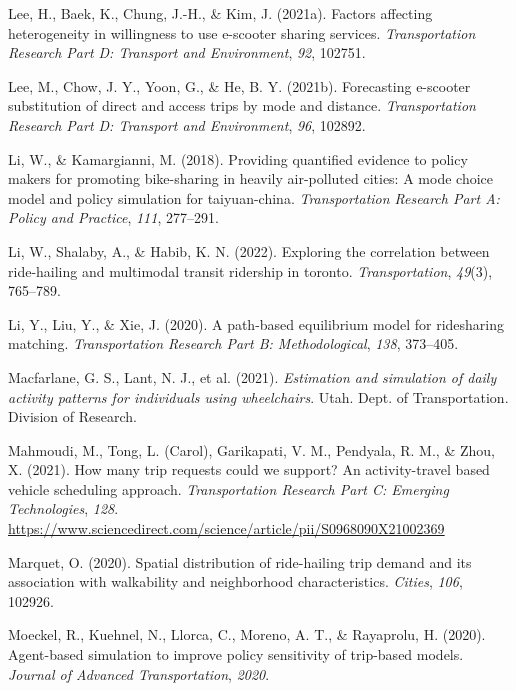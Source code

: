 \documentclass[fancy, masters]{byuthesis}
\newlength{\cslhangindent}
\newlength{\cslentryspacingunit} %
\newenvironment{CSLReferences}[2] %
 {%
  \setlength{\parindent}{0pt}
  \ifodd #1
  \let\oldpar\par
  \def\par{\hangindent=\cslhangindent\oldpar}
  \fi
  \setlength{\parskip}{#2\cslentryspacingunit}
 }%
 {}
\begin{document}
\begin{CSLReferences}{1}{0}
\leavevmode{}%
Lee, H., Baek, K., Chung, J.-H., \& Kim, J. (2021a). Factors affecting heterogeneity in willingness to use e-scooter sharing services. \emph{Transportation Research Part D: Transport and Environment}, \emph{92}, 102751.

\leavevmode{}%
Lee, M., Chow, J. Y., Yoon, G., \& He, B. Y. (2021b). Forecasting e-scooter substitution of direct and access trips by mode and distance. \emph{Transportation Research Part D: Transport and Environment}, \emph{96}, 102892.

\leavevmode{}%
Li, W., \& Kamargianni, M. (2018). Providing quantified evidence to policy makers for promoting bike-sharing in heavily air-polluted cities: A mode choice model and policy simulation for taiyuan-china. \emph{Transportation Research Part A: Policy and Practice}, \emph{111}, 277--291.

\leavevmode{}%
Li, W., Shalaby, A., \& Habib, K. N. (2022). Exploring the correlation between ride-hailing and multimodal transit ridership in toronto. \emph{Transportation}, \emph{49}(3), 765--789.

\leavevmode{}%
Li, Y., Liu, Y., \& Xie, J. (2020). A path-based equilibrium model for ridesharing matching. \emph{Transportation Research Part B: Methodological}, \emph{138}, 373--405.

\leavevmode{}%
Macfarlane, G. S., Lant, N. J., et al. (2021). \emph{Estimation and simulation of daily activity patterns for individuals using wheelchairs}. Utah. Dept. of Transportation. Division of Research.

\leavevmode{}%
Mahmoudi, M., Tong, L. (Carol), Garikapati, V. M., Pendyala, R. M., \& Zhou, X. (2021). How many trip requests could we support? An activity-travel based vehicle scheduling approach. \emph{Transportation Research Part C: Emerging Technologies}, \emph{128}. \url{https://www.sciencedirect.com/science/article/pii/S0968090X21002369}

\leavevmode{}%
Marquet, O. (2020). Spatial distribution of ride-hailing trip demand and its association with walkability and neighborhood characteristics. \emph{Cities}, \emph{106}, 102926.

\leavevmode{}%
Moeckel, R., Kuehnel, N., Llorca, C., Moreno, A. T., \& Rayaprolu, H. (2020). Agent-based simulation to improve policy sensitivity of trip-based models. \emph{Journal of Advanced Transportation}, \emph{2020}.


\end{CSLReferences}
\end{document}
